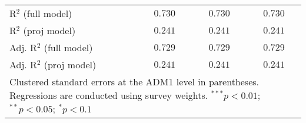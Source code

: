 \begin{table}[htbp]
\begin{center}
\begin{tabular}{l c c c}
R$^2$ (full model)                                    & $0.730$        & $0.730$        & $0.730$        \\
R$^2$ (proj model)                                    & $0.241$        & $0.241$        & $0.241$        \\
Adj. R$^2$ (full model)                               & $0.729$        & $0.729$        & $0.729$        \\
Adj. R$^2$ (proj model)                               & $0.241$        & $0.241$        & $0.241$        \\
\hline
\multicolumn{4}{l}{\scriptsize{Clustered standard errors at the ADM1 level in parentheses. Regressions are conducted using survey weights. $^{***}p<0.01$; $^{**}p<0.05$; $^{*}p<0.1$}}
\end{tabular}
\label{main: tableA8}
\end{center}
\end{table}
